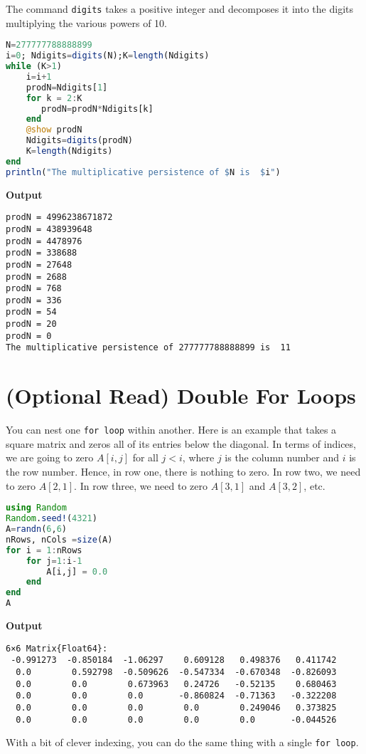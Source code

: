 The command \texttt{digits} takes a positive integer and decomposes it into the digits multiplying the various powers of 10.\\

\begin{lstlisting}[language=Julia,style=mystyle]
N=277777788888899
i=0; Ndigits=digits(N);K=length(Ndigits)  
while (K>1)
    i=i+1    
    prodN=Ndigits[1]
    for k = 2:K
       prodN=prodN*Ndigits[k]
    end
    @show prodN
    Ndigits=digits(prodN)
    K=length(Ndigits)  
end
println("The multiplicative persistence of $N is  $i")
\end{lstlisting}
\textbf{Output} 
\begin{verbatim}
prodN = 4996238671872
prodN = 438939648
prodN = 4478976
prodN = 338688
prodN = 27648
prodN = 2688
prodN = 768
prodN = 336
prodN = 54
prodN = 20
prodN = 0
The multiplicative persistence of 277777788888899 is  11
\end{verbatim}


\section{(Optional Read) Double For Loops}

You can nest one \texttt{for\,loop} within another. Here is an example that takes a square matrix and zeros all of its entries below the diagonal. In terms of indices, we are going to zero $A[i,j]$ for all $j < i$, where $j$ is the column number and $i$ is the row number. Hence, in row one, there is nothing to zero. In row two, we need to zero $A[2,1]$. In row three, we need to zero $A[3,1]$ and $A[3,2]$, etc.

\begin{lstlisting}[language=Julia,style=mystyle]
using Random
Random.seed!(4321)
A=randn(6,6)
nRows, nCols =size(A)
for i = 1:nRows
    for j=1:i-1
        A[i,j] = 0.0
    end
end
A
\end{lstlisting}
\textbf{Output} 
\begin{verbatim}
6×6 Matrix{Float64}:
 -0.991273  -0.850184  -1.06297    0.609128   0.498376   0.411742
  0.0        0.592798  -0.509626  -0.547334  -0.670348  -0.826093
  0.0        0.0        0.673963   0.24726   -0.52135    0.680463
  0.0        0.0        0.0       -0.860824  -0.71363   -0.322208
  0.0        0.0        0.0        0.0        0.249046   0.373825
  0.0        0.0        0.0        0.0        0.0       -0.044526
\end{verbatim}

With a bit of clever indexing, you can do the same thing with a single \texttt{for\,loop}.


